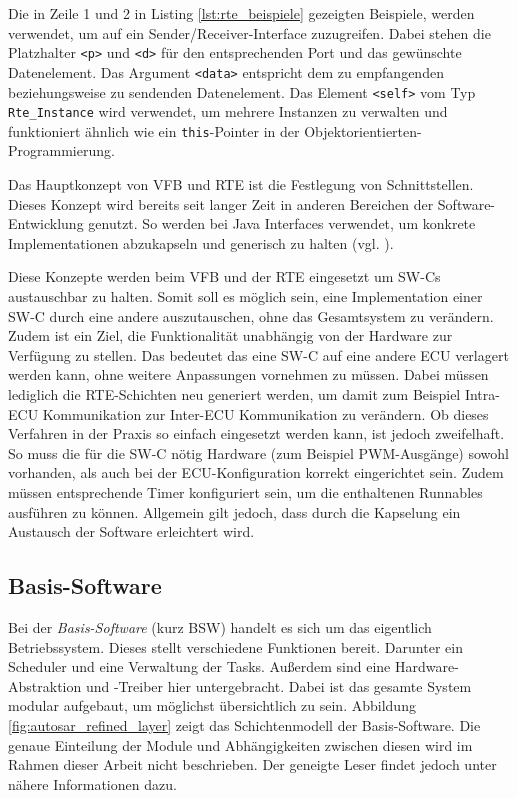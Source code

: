 \documentclass[
  a4paper,					    %
  twoside,
  DIV=calc,     				%
  bibliography=totoc,
  cleardoublepage=empty,
  ngerman,     					%
  final       					%
]{scrbook}
\begin{document}
Die in Zeile 1 und 2 in Listing \ref{lst:rte_beispiele} gezeigten Beispiele, werden verwendet, um auf ein Sender/Receiver-Interface zuzugreifen. Dabei stehen die Platzhalter \texttt{<p>} und \texttt{<d>} für den entsprechenden Port und das gewünschte Datenelement. Das Argument \texttt{<data>} entspricht dem zu empfangenden beziehungsweise zu sendenden Datenelement. Das Element \texttt{<self>} vom Typ \texttt{Rte\_Instance} wird verwendet, um mehrere Instanzen zu verwalten und funktioniert ähnlich wie ein \texttt{this}-Pointer in der Objektorientierten-Programmierung.

Das Hauptkonzept von VFB und RTE ist die Festlegung von Schnittstellen. Dieses Konzept wird bereits seit langer Zeit in anderen Bereichen der Software-Entwicklung genutzt. So werden bei Java Interfaces verwendet, um konkrete Implementationen abzukapseln und generisch zu halten (vgl. \cite{objektorientierung}).

Diese Konzepte werden beim VFB und der RTE eingesetzt um SW-Cs austauschbar zu halten. Somit soll es möglich sein, eine Implementation einer SW-C durch eine andere auszutauschen, ohne das Gesamtsystem zu verändern. Zudem ist ein Ziel, die Funktionalität unabhängig von der Hardware zur Verfügung zu stellen. Das bedeutet das eine SW-C auf eine andere ECU verlagert werden kann, ohne weitere Anpassungen vornehmen zu müssen. Dabei müssen lediglich die RTE-Schichten neu generiert werden, um damit zum Beispiel Intra-ECU Kommunikation zur Inter-ECU Kommunikation zu verändern. Ob dieses Verfahren in der Praxis so einfach eingesetzt werden kann, ist jedoch zweifelhaft. So muss die für die SW-C nötig Hardware (zum Beispiel PWM-Ausgänge) sowohl vorhanden, als auch bei der ECU-Konfiguration korrekt eingerichtet sein. Zudem müssen entsprechende Timer konfiguriert sein, um die enthaltenen Runnables ausführen zu können. Allgemein gilt jedoch, dass durch die Kapselung ein Austausch der Software erleichtert wird.








\subsection{Basis-Software}
\label{sec:bsw}
Bei der \emph{Basis-Software} (kurz BSW) handelt es sich um das eigentlich Betriebssystem. Dieses stellt verschiedene Funktionen bereit. Darunter ein Scheduler und eine Verwaltung der Tasks. Außerdem sind eine Hardware-Abstraktion und -Treiber hier untergebracht. Dabei ist das gesamte System modular aufgebaut, um möglichst übersichtlich zu sein. Abbildung \ref{fig:autosar_refined_layer} zeigt das Schichtenmodell der Basis-Software. Die genaue Einteilung der Module und Abhängigkeiten zwischen diesen wird im Rahmen dieser Arbeit nicht beschrieben. Der geneigte Leser findet jedoch unter \cite{autosar_layer} nähere Informationen dazu.
\end{document}
